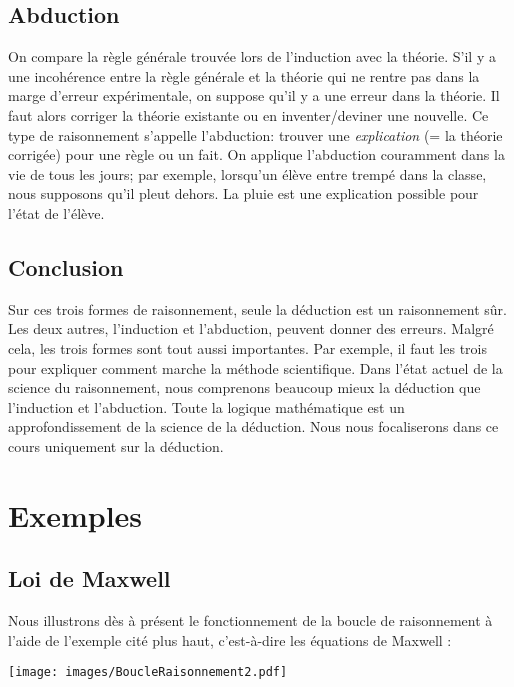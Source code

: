 \subsection{Abduction}

On compare la règle générale trouvée lors de l'induction avec la théorie.
S'il y a une incohérence entre la règle générale et la théorie qui ne rentre pas dans la marge d'erreur expérimentale, on suppose qu'il y a une erreur dans la théorie.
Il faut alors corriger la théorie existante ou en inventer/deviner une nouvelle. 
Ce type de raisonnement s'appelle l'abduction:
trouver une {\em explication} (= la théorie corrigée) pour une règle ou un fait.
On applique l'abduction couramment dans la vie de tous les jours; par exemple, lorsqu'un élève entre trempé dans la classe, nous supposons qu'il pleut dehors.
La pluie est une explication possible pour l'état de l'élève. \\

\subsection{Conclusion}

Sur ces trois formes de raisonnement, seule la déduction est un raisonnement sûr.
Les deux autres, l'induction et l'abduction, peuvent donner des erreurs.
Malgré cela, les trois formes sont tout aussi importantes.
Par exemple, il faut les trois pour expliquer comment marche la méthode scientifique.
Dans l'état actuel de la science du raisonnement,
nous comprenons beaucoup mieux la déduction que l'induction et l'abduction.
Toute la logique mathématique est un approfondissement de la science de la déduction.
Nous nous focaliserons dans ce cours uniquement sur la déduction. \\

\section{Exemples}

\subsection{Loi de Maxwell}

Nous illustrons dès à présent le fonctionnement de la boucle de raisonnement à l'aide de l'exemple cité plus haut, c'est-à-dire les équations de Maxwell :

\begin{center}
\texttt{[image: images/BoucleRaisonnement2.pdf]}
\end{center}

